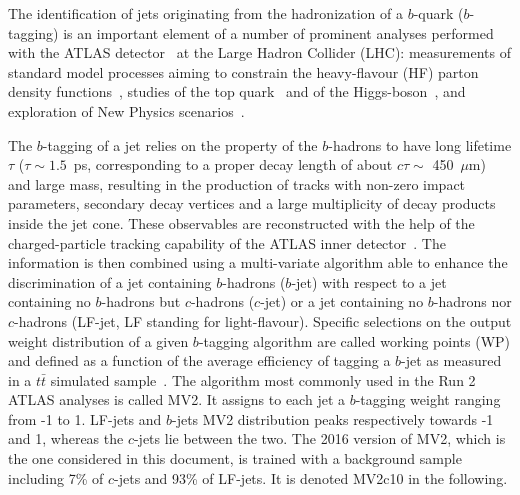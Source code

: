 \newcommand{\AtlasCoordFootnote}{%
ATLAS uses a right-handed coordinate system with its origin at the nominal interaction point (IP)
in the centre of the detector and the $z$-axis along the beam pipe.
The $x$-axis points from the IP to the centre of the LHC ring,
and the $y$-axis points upwards.
Cylindrical coordinates $(r,\phi)$ are used in the transverse plane,
$\phi$ being the azimuthal angle around the $z$-axis.
The pseudorapidity is defined in terms of the polar angle $\theta$ as $\eta = -\ln \tan(\theta/2)$.
Angular distance is measured in units of $\Delta R \equiv \sqrt{(\Delta\eta)^{2} + (\Delta\phi)^{2}}$. The transverse energy is defined as $p_{\mathrm{T}} = E / \cosh(\eta)$.}


The identification of jets originating from the hadronization of a $b$-quark ($b$-tagging) is an important element of a number of prominent analyses performed with the ATLAS detector~\cite{PERF-2007-01} at the Large Hadron Collider (LHC): measurements of standard model processes aiming to constrain the heavy-flavour (HF) parton density functions~\cite{photon_hf}, studies of the top quark~\cite{TOPQ-2013-04} and of the Higgs-boson~\cite{Hbb,ttHtobb}, and exploration of New Physics scenarios~\cite{ttbar_MET, EXOT-2016-12}.

The $b$-tagging of a jet relies on the property of the $b$-hadrons to have long lifetime $\tau$ (${\tau\sim1.5}$~ps, corresponding to a proper decay length of about $c\tau\sim$ 450~$\mu$m) and large mass, resulting in the production of tracks with non-zero impact parameters, secondary decay vertices and a large multiplicity of decay products inside the jet cone. These observables are reconstructed with the help of the charged-particle tracking capability of the ATLAS inner detector~\cite{PERF-2012-04}. The information is then combined using a multi-variate algorithm able to enhance the discrimination of a jet containing $b$-hadrons ($b$-jet) with respect to a jet containing no $b$-hadrons but $c$-hadrons ($c$-jet) or a jet containing no $b$-hadrons nor $c$-hadrons (LF-jet, LF standing for light-flavour). Specific selections on the output weight distribution of a given $b$-tagging algorithm are called working points (WP) and defined as a function of the average efficiency of tagging a $b$-jet as measured in a $t\bar{t}$ simulated sample~\cite{perf_run2,perf_run2_2}. The algorithm most commonly used in the Run 2 ATLAS analyses is called MV2. It assigns to each jet a $b$-tagging weight ranging from -1 to 1. LF-jets and $b$-jets MV2 distribution peaks respectively towards -1 and 1, whereas the $c$-jets lie between the two. The 2016 version of MV2, which is the one considered in this document, is trained with a background sample including 7\% of $c$-jets and 93\% of LF-jets. It is denoted MV2c10 in the following.

